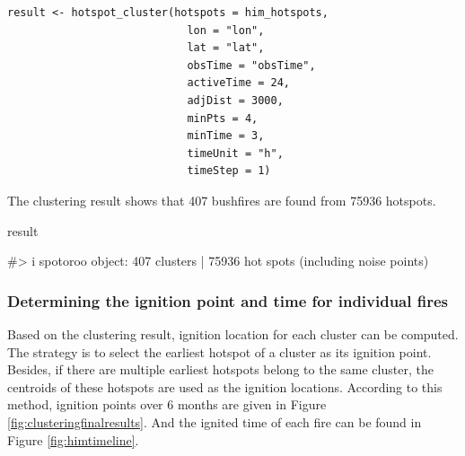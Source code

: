 \begin{verbatim}
result <- hotspot_cluster(hotspots = him_hotspots,
                            lon = "lon",
                            lat = "lat",
                            obsTime = "obsTime",
                            activeTime = 24,
                            adjDist = 3000,
                            minPts = 4,
                            minTime = 3,
                            timeUnit = "h",
                            timeStep = 1)
\end{verbatim}

The clustering result shows that 407 bushfires are found from 75936
hotspots.

\begin{Schunk}
\begin{Sinput}
result
\end{Sinput}
\begin{Soutput}
#> i spotoroo object: 407 clusters | 75936 hot spots (including noise points)
\end{Soutput}
\end{Schunk}

\hypertarget{determining-the-ignition-point-and-time-for-individual-fires}{%
\subsubsection{Determining the ignition point and time for individual
fires}\label{determining-the-ignition-point-and-time-for-individual-fires}}

Based on the clustering result, ignition location for each cluster can
be computed. The strategy is to select the earliest hotspot of a cluster
as its ignition point. Besides, if there are multiple earliest hotspots
belong to the same cluster, the centroids of these hotspots are used as
the ignition locations. According to this method, ignition points over 6
months are given in Figure \ref{fig:clusteringfinalresults}. And the
ignited time of each fire can be found in Figure \ref{fig:himtimeline}.


